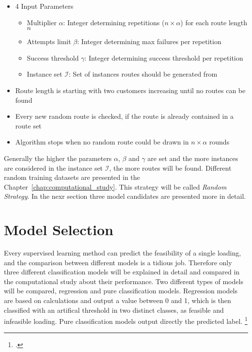 \begin{itemize}
    \item 4 Input Parameters
          \begin{itemize}
              \item Multiplier $\alpha$: Integer determining repetitions ($n\times\alpha$) for each route length $n$
              \item  Attempts limit $\beta$: Integer determining max failures per repetition
              \item  Success threshold $\gamma$: Integer determining success threshold per repetition
              \item Instance set $\mathcal{I}$: Set of instances routes should be generated from
          \end{itemize}
    \item Route length is starting with two customers increasing until no routes can be found
    \item Every new random route is checked, if the route is already contained in a route set
    \item Algorithm stops when no random route could be drawn in $n \times \alpha$ rounds
\end{itemize}

Generally the higher the parameters $\alpha$, $\beta$ and $\gamma$ are set and the more instances
are considered in the instance set $\mathcal{I}$, the more routes will be found. Different
random training datasets are presented in the Chapter~\ref{chap:computational_study}.
This strategy will be called \textit{Random Strategy}. In the nexr section three model candidates
are presented more in detail.

\section{Model Selection}
\label{sec:modelselection}
Every supervised learning method can predict the feasibility of a single loading, and the comparison
between different models is a tidious job. Therefore only three different classification
models will be explained in detail and compared in the computational study about their performance.
Two different types of models will be compared, regression and pure classification models. Regression
models are based on calculations and output a value between 0 and 1, which is then classified with
an artifical threshold in two distinct classes, as feasible and infeasible loading. Pure classification
models output directly the predicted label. \footcite[cf.][p.5]{nasteski_overview_2017}

